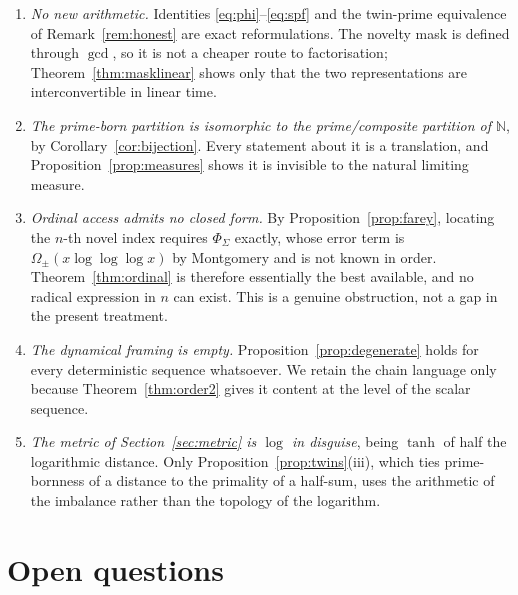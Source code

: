 \documentclass[11pt,a4paper]{article}
\theoremstyle{plain}
\theoremstyle{definition}
\theoremstyle{remark}
\newcommand{\N}{\mathbb{N}}
\begin{document}
\begin{enumerate}
  \item \emph{No new arithmetic.} Identities \eqref{eq:phi}--\eqref{eq:spf} and
    the twin-prime equivalence of Remark~\ref{rem:honest} are exact
    reformulations. The novelty mask is defined through $\gcd$, so it is not a
    cheaper route to factorisation; Theorem~\ref{thm:masklinear} shows only that
    the two representations are interconvertible in linear time.
  \item \emph{The prime-born partition is isomorphic to the prime/composite
    partition of $\N$}, by Corollary~\ref{cor:bijection}. Every statement about
    it is a translation, and Proposition~\ref{prop:measures} shows it is
    invisible to the natural limiting measure.
  \item \emph{Ordinal access admits no closed form.} By
    Proposition~\ref{prop:farey}, locating the $n$-th novel index requires
    $\Phi_\Sigma$ exactly, whose error term is
    $\Omega_\pm(x \log\log\log x)$ by Montgomery \cite{Montgomery1987} and is
    not known in order. Theorem~\ref{thm:ordinal} is therefore essentially the
    best available, and no radical expression in $n$ can exist. This is a
    genuine obstruction, not a gap in the present treatment.
  \item \emph{The dynamical framing is empty.} Proposition~\ref{prop:degenerate}
    holds for every deterministic sequence whatsoever. We retain the chain
    language only because Theorem~\ref{thm:order2} gives it content at the level
    of the scalar sequence.
  \item \emph{The metric of Section~\ref{sec:metric} is $\log$ in disguise},
    being $\tanh$ of half the logarithmic distance. Only
    Proposition~\ref{prop:twins}(iii), which ties prime-bornness of a distance to
    the primality of a half-sum, uses the arithmetic of the imbalance rather
    than the topology of the logarithm.
\end{enumerate}

\section{Open questions}
\end{document}
